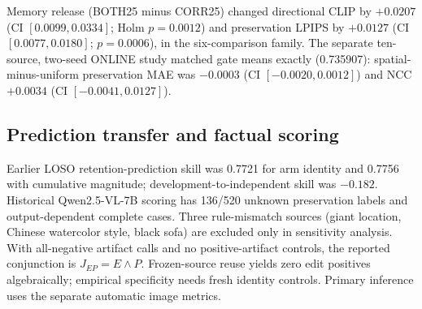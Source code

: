 \documentclass[10pt,doubleanonymous]{ieeeconf}
\begin{document}
Memory release (BOTH25 minus CORR25) changed directional CLIP by $+0.0207$ (CI $[0.0099,0.0334]$; Holm $p=0.0012$) and preservation LPIPS by $+0.0127$ (CI $[0.0077,0.0180]$; $p=0.0006$), in the six-comparison family. The separate ten-source, two-seed ONLINE study matched gate means exactly (0.735907): spatial-minus-uniform preservation MAE was $-0.0003$ (CI $[-0.0020,0.0012]$) and NCC $+0.0034$ (CI $[-0.0041,0.0127]$).

\subsection{Prediction transfer and factual scoring}
Earlier LOSO retention-prediction skill was 0.7721 for arm identity and 0.7756 with cumulative magnitude; development-to-independent skill was $-0.182$. Historical Qwen2.5-VL-7B scoring has 136/520 unknown preservation labels and output-dependent complete cases. Three rule-mismatch sources (giant location, Chinese watercolor style, black sofa) are excluded only in sensitivity analysis. With all-negative artifact calls and no positive-artifact controls, the reported conjunction is $J_{EP}=E\land P$. Frozen-source reuse yields zero edit positives algebraically; empirical specificity needs fresh identity controls. Primary inference uses the separate automatic image metrics.
\end{document}
